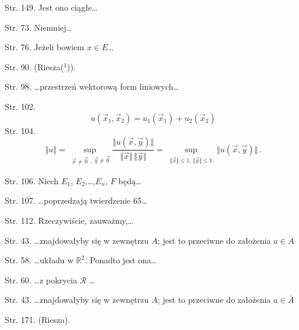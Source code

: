 \documentclass[a4paper,11pt]{article}
\begin{document}
\start Str. 149. Jest ono ciągłe\ldots

\start Str. 73. Niemniej\ldots

\start Str. 76. Jeżeli bowiem $x \in E$\ldots

\start Str. 90. \large{(Riesza($^{ 1 }$))}.

\start Str. 98. \ldots przestrzeń wektorową form liniowych\ldots

\start Str. 102.
$$u(\vec{x}_{1},\vec{x}_{2})=u_{1}(\vec{x}_{1})+u_{2}(\vec{x}_{2})$$
\start Str. 104.
$$\Vert u \Vert = \sup_{ \substack{ \vec{ x } \neq \vec{ 0 } },
  \,\vec{ y } \neq \vec{ 0 } } \frac{ \Vert u( \vec x, \vec y ) \Vert
}{ \Vert \vec{ x } \Vert \, \Vert \vec y \Vert } = \sup_{ \substack{
    \Vert \vec{ x } \Vert \leq 1, \, \Vert \vec{ y } \Vert \leq 1 } }
\Vert u( \vec x, \vec y ) \Vert \, .$$

\start Str. 106. Niech $E_{ 1 }$, $E_{ 2 }$,\ldots,$E_{ n }$, $F$
będą\ldots

\start Str. 107. \ldots poprzedzają twierdzenie 65\ldots

\start Str. 112. Rzeczywiście, zauważmy,\ldots

\start Str. 43. \ldots znajdowałyby się w zewnętrzu $A$; jest to
przeciwne do założenia $a \in \overline{ A }$

\start Str. 58. \ldots układu w $\mathbb{R}^{ 2 }$. Ponadto jest
ona\ldots

\start Str. 60. \ldots z pokrycia $\mathcal{R}$ \ldots

\start Str. 43. \ldots znajdowałyby się w zewnętrzu $A$; jest to
przeciwne do założenia $a \in \overline{ A }$


\start Str. 171. \large{(Riesza)}.





\newpage
{}



\end{document}
